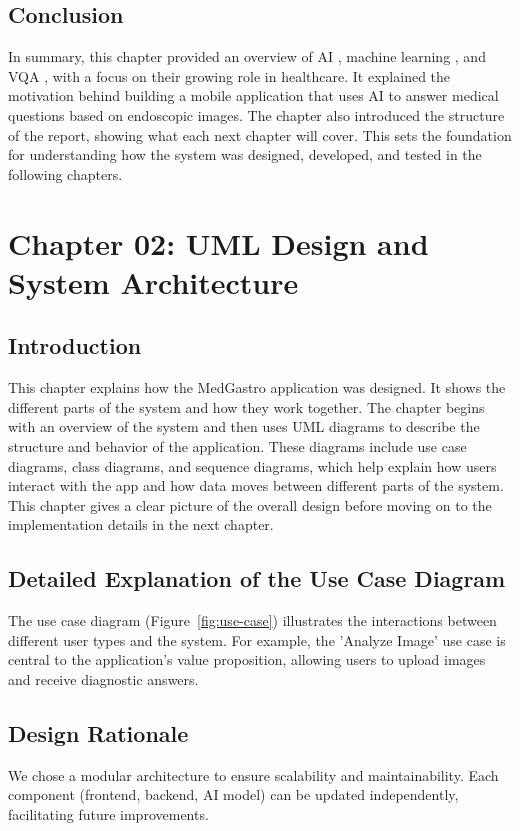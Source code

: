 \documentclass[12pt,a4paper]{report}
\begin{document}
\section{Conclusion}
In summary, this chapter provided an overview of AI , machine learning , and VQA , with a focus on their growing role in healthcare. It explained the motivation behind building a mobile application that uses AI to answer medical questions based on endoscopic images. The chapter also introduced the structure of the report, showing what each next chapter will cover. This sets the foundation for understanding how the system was designed, developed, and tested in the following chapters.

\chapter{Chapter 02: UML Design and System Architecture}
\section{Introduction}
This chapter explains how the MedGastro application was designed. It shows the different parts of the system and how they work together. The chapter begins with an overview of the system and then uses UML diagrams to describe the structure and behavior of the application. These diagrams include use case diagrams, class diagrams, and sequence diagrams, which help explain how users interact with the app and how data moves between different parts of the system. This chapter gives a clear picture of the overall design before moving on to the implementation details in the next chapter.

\section{Detailed Explanation of the Use Case Diagram}
The use case diagram (Figure~\ref{fig:use-case}) illustrates the interactions between different user types and the system. For example, the 'Analyze Image' use case is central to the application's value proposition, allowing users to upload images and receive diagnostic answers.

\section{Design Rationale}
We chose a modular architecture to ensure scalability and maintainability. Each component (frontend, backend, AI model) can be updated independently, facilitating future improvements.
\end{document}
